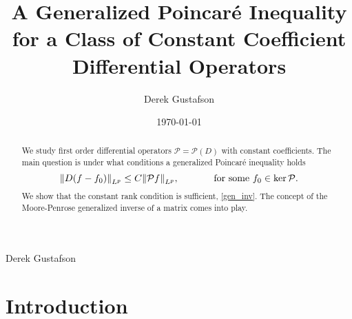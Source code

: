 \documentclass{amsart}
\theoremstyle{definition}
\numberwithin{equation}{section}
\begin{document}
\title{A Generalized Poincar\'{e} Inequality for a Class of Constant Coefficient Differential Operators}

\author{Derek Gustafson} \address{Department of Mathematics, Syracuse University, Syracuse, NY 13210}

\copyrightinfo{\currentyear} {Derek Gustafson}

\date{\today}

\begin{abstract} 
We study first order differential operators ${\mathcal{P}} = {\mathcal{P}}(D)$ with constant coefficients.  The main question is under what conditions a generalized Poincar\'{e} inequality holds $${\left\Vert{ D(f-f_0)}\right\Vert}_{L^p} \leq C {\left\Vert{ {\mathcal{P}} f}\right\Vert}_{L^p}, \hspace{.5in} \textrm{for some } f_0 \in \ker {\mathcal{P}}.$$ We show that the constant rank condition is sufficient, \autoref{gen_inv}.  The concept of the Moore-Penrose generalized inverse of a matrix comes into play. 
 \end{abstract}

\maketitle

\section{Introduction}
\end{document}
